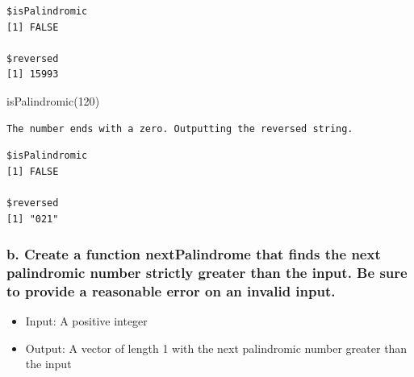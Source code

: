 \documentclass[
  letterpaper,
  DIV=11,
  numbers=noendperiod]{scrartcl}
\newenvironment{Shaded}{\begin{snugshade}}{\end{snugshade}}
\newcommand{\DecValTok}[1]{\textcolor[rgb]{0.68,0.00,0.00}{#1}}
\newcommand{\FunctionTok}[1]{\textcolor[rgb]{0.28,0.35,0.67}{#1}}
\newcommand{\NormalTok}[1]{\textcolor[rgb]{0.00,0.23,0.31}{#1}}
\providecommand{\tightlist}{%
  \setlength{\itemsep}{0pt}\setlength{\parskip}{0pt}}\usepackage{longtable,booktabs,array}
\begin{document}
\begin{verbatim}
$isPalindromic
[1] FALSE

$reversed
[1] 15993
\end{verbatim}

\begin{Shaded}
\begin{Highlighting}[]
\FunctionTok{isPalindromic}\NormalTok{(}\DecValTok{120}\NormalTok{)}
\end{Highlighting}
\end{Shaded}

\begin{verbatim}
The number ends with a zero. Outputting the reversed string.
\end{verbatim}

\begin{verbatim}
$isPalindromic
[1] FALSE

$reversed
[1] "021"
\end{verbatim}

\subsubsection{b. Create a function nextPalindrome that finds the next
palindromic number strictly greater than the input. Be sure to provide a
reasonable error on an invalid
input.}\label{b.-create-a-function-nextpalindrome-that-finds-the-next-palindromic-number-strictly-greater-than-the-input.-be-sure-to-provide-a-reasonable-error-on-an-invalid-input.}

\begin{itemize}
\tightlist
\item
  Input: A positive integer
\item
  Output: A vector of length 1 with the next palindromic number greater
  than the input
\end{itemize}
\end{document}
